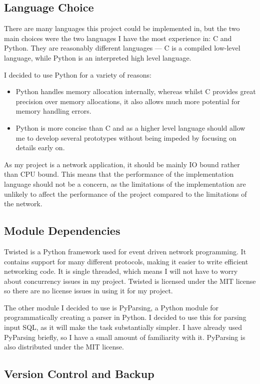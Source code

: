\documentclass[12pt,twoside,notitlepage]{report}
\begin{document}
\subsection{Language Choice}

There are many languages this project could be implemented in, but the two main choices were the
two languages I have the most experience in: C and Python. They are reasonably different languages
--- C is a compiled low-level language, while Python is an interpreted high level language.

I decided to use Python for a variety of reasons:
\begin{itemize}
\item Python handles memory allocation internally, whereas whilst C provides great precision over memory
allocations, it also allows much more potential for memory handling errors.
\item Python is more concise than C and as a higher level language should allow me to develop several
prototypes without being impeded by focusing on details early on.
\end{itemize}

As my project is a network application, it should be mainly IO bound rather than CPU bound.
This means that the performance of the implementation language should not be a concern, as the
limitations of the implementation are unlikely to affect the performance of the project compared
to the limitations of the network.

\subsection{Module Dependencies}

Twisted is a Python framework used for event driven network programming. It contains support for
many different protocols, making it easier to write efficient networking code.  It is single
threaded, which means I will not have to worry about concurrency issues in my project. Twisted is
licensed under the MIT license so there are no license issues in using it for my project.

The other module I decided to use is PyParsing, a Python module for programmatically creating a
parser in Python. I decided to use this for parsing input SQL, as it will make the task
substantially simpler. I have already used PyParsing briefly, so I have a small amount of
familiarity with it. PyParsing is also distributed under the MIT license.

\subsection{Version Control and Backup}
\end{document}
